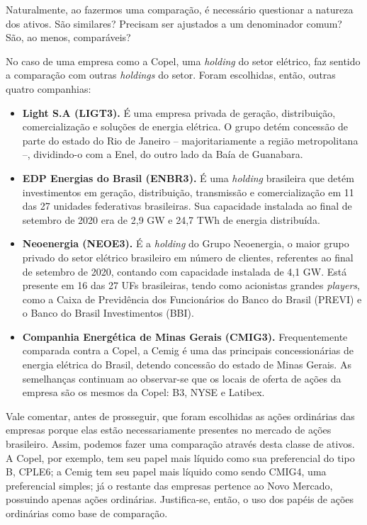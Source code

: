 \documentclass[grad,numbers]{coppe}
\providecommand{\tightlist}{%
  \setlength{\itemsep}{0pt}\setlength{\parskip}{0pt}}
\begin{document}
  Naturalmente, ao fazermos uma comparação, é necessário questionar a natureza dos ativos. São similares? Precisam ser ajustados a um denominador comum? São, ao menos, comparáveis?

  No caso de uma empresa como a Copel, uma \emph{holding} do setor elétrico, faz sentido a comparação com outras \emph{holdings} do setor. Foram escolhidas, então, outras quatro companhias:
  \begin{itemize}
  \tightlist
  \item
    \textbf{Light S.A (LIGT3).} É uma empresa privada de geração, distribuição, comercialização e soluções de energia elétrica. O grupo detém concessão de parte do estado do Rio de Janeiro -- majoritariamente a região metropolitana --, dividindo-o com a Enel, do outro lado da Baía de Guanabara.
  \item
    \textbf{EDP Energias do Brasil (ENBR3).} É uma \emph{holding} brasileira que detém investimentos em geração, distribuição, transmissão e comercialização em 11 das 27 unidades federativas brasileiras. Sua capacidade instalada ao final de setembro de 2020 era de 2,9 GW e 24,7 TWh de energia distribuída.
  \item
    \textbf{Neoenergia (NEOE3).} É a \emph{holding} do Grupo Neoenergia, o maior grupo privado do setor elétrico brasileiro em número de clientes, referentes ao final de setembro de 2020, contando com capacidade instalada de 4,1 GW. Está presente em 16 das 27 UFs brasileiras, tendo como acionistas grandes \emph{players}, como a Caixa de Previdência dos Funcionários do Banco do Brasil (PREVI) e o Banco do Brasil Investimentos (BBI).
  \item
    \textbf{Companhia Energética de Minas Gerais (CMIG3).} Frequentemente comparada contra a Copel, a Cemig é uma das principais concessionárias de energia elétrica do Brasil, detendo concessão do estado de Minas Gerais. As semelhanças continuam ao observar-se que os locais de oferta de ações da empresa são os mesmos da Copel: B3, NYSE e Latibex.
  \end{itemize}
  Vale comentar, antes de prosseguir, que foram escolhidas as ações ordinárias das empresas porque elas estão necessariamente presentes no mercado de ações brasileiro. Assim, podemos fazer uma comparação através desta classe de ativos. A Copel, por exemplo, tem seu papel mais líquido como sua preferencial do tipo B, CPLE6; a Cemig tem seu papel mais líquido como sendo CMIG4, uma preferencial simples; já o restante das empresas pertence ao Novo Mercado, possuindo apenas ações ordinárias. Justifica-se, então, o uso dos papéis de ações ordinárias como base de comparação.
\end{document}
